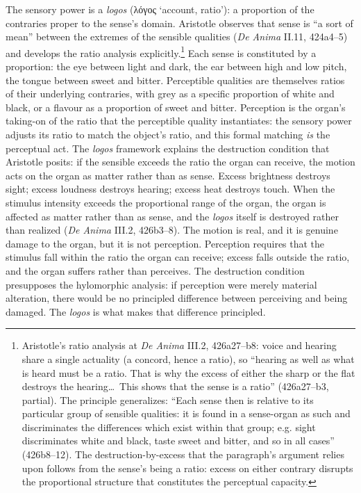 \documentclass{article}
\newcommand{\gk}[1]{{\greekfont #1}}
\begin{document}
The sensory power is a \textit{logos} (\gk{λόγος} `account, ratio'): a proportion of the contraries proper to the sense's domain. Aristotle observes that sense is ``a sort of mean'' between the extremes of the sensible qualities (\textit{De Anima} II.11, 424a4--5) and develops the ratio analysis explicitly.\footnote{Aristotle's ratio analysis at \textit{De Anima} III.2, 426a27--b8: voice and hearing share a single actuality (a concord, hence a ratio), so ``hearing as well as what is heard must be a ratio. That is why the excess of either the sharp or the flat destroys the hearing\ldots\ This shows that the sense is a ratio'' (426a27--b3, partial). The principle generalizes: ``Each sense then is relative to its particular group of sensible qualities: it is found in a sense-organ as such and discriminates the differences which exist within that group; e.g. sight discriminates white and black, taste sweet and bitter, and so in all cases'' (426b8--12). The destruction-by-excess that the paragraph's argument relies upon follows from the sense's being a ratio: excess on either contrary disrupts the proportional structure that constitutes the perceptual capacity.} Each sense is constituted by a proportion: the eye between light and dark, the ear between high and low pitch, the tongue between sweet and bitter. Perceptible qualities are themselves ratios of their underlying contraries, with grey as a specific proportion of white and black, or a flavour as a proportion of sweet and bitter. Perception is the organ's taking-on of the ratio that the perceptible quality instantiates: the sensory power adjusts its ratio to match the object's ratio, and this formal matching \textit{is} the perceptual act. The \textit{logos} framework explains the destruction condition that Aristotle posits: if the sensible exceeds the ratio the organ can receive, the motion acts on the organ as matter rather than as sense. Excess brightness destroys sight; excess loudness destroys hearing; excess heat destroys touch. When the stimulus intensity exceeds the proportional range of the organ, the organ is affected as matter rather than as sense, and the \textit{logos} itself is destroyed rather than realized (\textit{De Anima} III.2, 426b3--8). The motion is real, and it is genuine damage to the organ, but it is not perception. Perception requires that the stimulus fall within the ratio the organ can receive; excess falls outside the ratio, and the organ suffers rather than perceives. The destruction condition presupposes the hylomorphic analysis: if perception were merely material alteration, there would be no principled difference between perceiving and being damaged. The \textit{logos} is what makes that difference principled.
\end{document}
